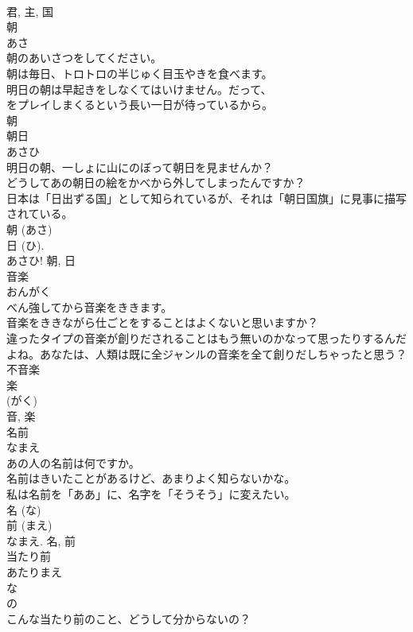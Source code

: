 \documentclass[8pt]{extreport}
\begin{document}
\begin{CJK}{UTF8}{min}
\\	君, 主, 国	
\\	朝	
\\	あさ	
\\	朝のあいさつをしてください。	
\\	朝は毎日、トロトロの半じゅく目玉やきを食べます。	
\\	明日の朝は早起きをしなくてはいけません。だって、
\\	をプレイしまくるという長い一日が待っているから。	
\\	朝	
\\	朝日	
\\	あさひ	
\\	明日の朝、一しょに山にのぼって朝日を見ませんか？	
\\	どうしてあの朝日の絵をかべから外してしまったんですか？	
\\	日本は「日出ずる国」として知られているが、それは「朝日国旗」に見事に描写されている。	
\\	朝 (あさ) 
\\	日 (ひ). 
\\	あさひ!	朝, 日	
\\	音楽	
\\	おんがく	
\\	べん強してから音楽をききます。	
\\	音楽をききながら仕ごとをすることはよくないと思いますか？	
\\	違ったタイプの音楽が創りだされることはもう無いのかなって思ったりするんだよね。あなたは、人類は既に全ジャンルの音楽を全て創りだしちゃったと思う？	
\\	不音楽 
\\	楽 
\\	(がく) 
\\	音, 楽	
\\	名前	
\\	なまえ	
\\	あの人の名前は何ですか。	
\\	名前はきいたことがあるけど、あまりよく知らないかな。	
\\	私は名前を「ああ」に、名字を「そうそう」に変えたい。	
\\	名 (な) 
\\	前 (まえ) 
\\	なまえ.	名, 前	
\\	当たり前	
\\	あたりまえ	
\\	な 
\\	の 
\\	こんな当たり前のこと、どうして分からないの？	

\end{CJK}
\end{document}
